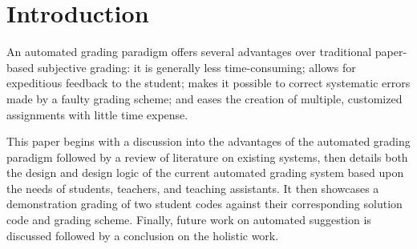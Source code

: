 \section{Introduction}

An automated grading paradigm offers several advantages over traditional
paper-based subjective grading: it is generally less time-consuming; allows for
expeditious feedback to the student; makes it possible to correct systematic
errors made by a faulty grading scheme; and eases the creation of multiple,
customized assignments with little time expense. 

This paper begins with a discussion into the advantages of the
automated grading paradigm followed by a review of literature on existing
systems, then details both the design and design logic of the current automated
grading system based upon the needs of students, teachers, and teaching
assistants.  It then showcases a demonstration grading of two student codes
against their corresponding solution code and grading scheme. Finally, future
work on automated suggestion is discussed followed by a conclusion on the
holistic work.
